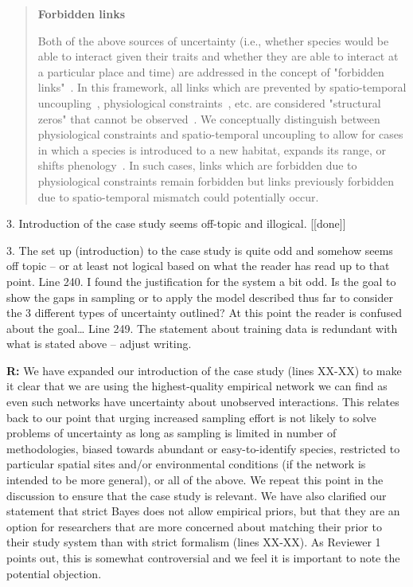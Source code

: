 \documentclass[12pt]{letter}
\newenvironment{refquote}{\bigskip \begin{it}}{\end{it}\smallskip}
\begin{document}
\begin{itemize}
			\begin{quotation}

        \textbf{Forbidden links}

            Both of the above sources of uncertainty (i.e., whether species would be able to interact given their traits and whether they are able to interact at a particular place and time) are addressed in the concept of "forbidden links"~\citep{Jordano2016}. In this framework, all links which are prevented by spatio-temporal uncoupling~\citep{Jordano1987}, physiological constraints~\citep{Jordano1987,More2012}, etc. are considered "structural zeros" that cannot be observed~\citep{Jordano2016}. We conceptually distinguish between physiological constraints and spatio-temporal uncoupling to allow for cases in which a species is introduced to a new habitat, expands its range, or shifts phenology~\citep{Gravel2013}. In such cases, links which are forbidden due to physiological constraints remain forbidden but links previously forbidden due to spatio-temporal mismatch could potentially occur. 

      \end{quotation}


	3. Introduction of the case study seems off-topic and illogical. [[done]]

		\begin{refquote}
		3.      The set up (introduction) to the case study is quite odd and somehow seems off topic – or at least not logical based on what the reader has read up to that point.
		\medskip
		Line 240.  I found the justification for the system a bit odd.  Is the goal to show the gaps in sampling or to apply the model described thus far to consider the 3 different types of uncertainty outlined?  At this point the reader is confused about the goal…
		\medskip
		Line 249.  The statement about training data is redundant with what is stated above – adjust writing.
		\end{refquote}

		\textbf{R:} We have expanded our introduction of the case study (lines XX-XX) to make it clear that we are using the highest-quality empirical network we can find as even such networks have uncertainty about unobserved interactions. This relates back to our point that urging increased sampling effort is not likely to solve problems of uncertainty as long as sampling is limited in number of methodologies, biased towards abundant or easy-to-identify species, restricted to particular spatial sites and/or environmental conditions (if the network is intended to be more general), or all of the above. We repeat this point in the discussion to ensure that the case study is relevant. We have also clarified our statement that strict Bayes does not allow empirical priors, but that they are an option for researchers that are more concerned about matching their prior to their study system than with strict formalism (lines XX-XX). As Reviewer 1 points out, this is somewhat controversial and we feel it is important to note the potential objection.


\end{itemize}
\end{document}

